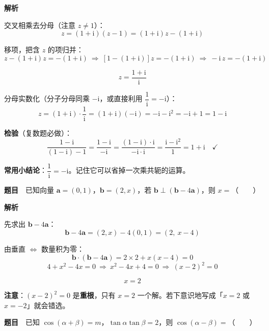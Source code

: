 \textbf{解析}

交叉相乘去分母（注意 $z\ne1$）：
\[z=(1+\mathrm i)(z-1)=(1+\mathrm i)z-(1+\mathrm i)\]

移项，把含 $z$ 的项归并：
\[z-(1+\mathrm i)z=-(1+\mathrm i)\ \Longrightarrow\ \left[1-(1+\mathrm i)\right]z=-(1+\mathrm i)\ \Longrightarrow\ -\mathrm i\,z=-(1+\mathrm i)\]

\[z=\frac{1+\mathrm i}{\mathrm i}\]

分母实数化（分子分母同乘 $-\mathrm i$，或直接利用 $\dfrac1{\mathrm i}=-\mathrm i$）：
\[z=(1+\mathrm i)\cdot\frac1{\mathrm i}=(1+\mathrm i)(-\mathrm i)=-\mathrm i-\mathrm i^{2}=-\mathrm i+1=1-\mathrm i\]

\textbf{检验}（复数题必做）：
\[\frac{1-\mathrm i}{(1-\mathrm i)-1}=\frac{1-\mathrm i}{-\mathrm i}=\frac{(1-\mathrm i)\cdot\mathrm i}{-\mathrm i\cdot\mathrm i}=\frac{\mathrm i-\mathrm i^{2}}{1}=1+\mathrm i\quad\checkmark\]


\begin{gktip}
\textbf{常用小结论}：$\dfrac1{\mathrm i}=-\mathrm i$。记住它可以省掉一次乘共轭的运算。
\end{gktip}

\par\medskip


\textbf{题目}　已知向量 $\boldsymbol a=(0,1)$，$\boldsymbol b=(2,x)$，若 $\boldsymbol b\perp(\boldsymbol b-4\boldsymbol a)$，则 $x=$（　　）

\textbf{解析}

先求出 $\boldsymbol b-4\boldsymbol a$：
\[\boldsymbol b-4\boldsymbol a=(2,x)-4(0,1)=(2,\ x-4)\]

由垂直 $\iff$ 数量积为零：
\[\boldsymbol b\cdot(\boldsymbol b-4\boldsymbol a)=2\times2+x(x-4)=0\]
\[4+x^{2}-4x=0\ \Longrightarrow\ x^{2}-4x+4=0\ \Longrightarrow\ (x-2)^{2}=0\]

\[x=2\]


\begin{gktip}
\textbf{注意}：$(x-2)^2=0$ 是\textbf{重根}，只有 $x=2$ 一个解。若下意识地写成「$x=2$ 或 $x=-2$」就会错选。
\end{gktip}

\par\medskip


\textbf{题目}　已知 $\cos(\alpha+\beta)=m$，$\tan\alpha\tan\beta=2$，则 $\cos(\alpha-\beta)=$（　　）

